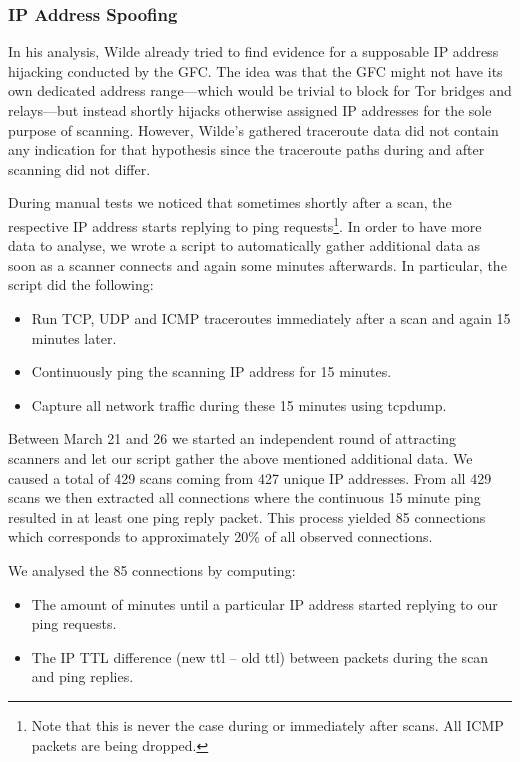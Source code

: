 \documentclass[runningheads,a4paper]{llncs}
\begin{document}
\subsubsection{IP Address Spoofing}
In his analysis, Wilde \cite{twilde} already tried to find evidence for a supposable IP address
hijacking conducted by the GFC. The idea was that the GFC might not have its own dedicated address
range---which would be trivial to block for Tor bridges and relays---but instead shortly hijacks
otherwise assigned IP addresses for the sole purpose of scanning. However, Wilde's gathered
traceroute data did not contain any indication for that hypothesis since the traceroute paths during
and after scanning did not differ.

During manual tests we noticed that sometimes shortly after a scan, the respective IP address starts
replying to ping requests\footnote{Note that this is never the case during or immediately after
scans. All ICMP packets are being dropped.}. In order to have more data to analyse, we wrote a
script to automatically gather additional data as soon as a scanner connects and again some minutes
afterwards. In particular, the script did the following:
\begin{itemize}
	\item Run TCP, UDP and ICMP traceroutes immediately after a scan and again 15 minutes later.
	\item Continuously ping the scanning IP address for 15 minutes.
	\item Capture all network traffic during these 15 minutes using tcpdump.
\end{itemize}

Between March 21 and 26 we started an independent round of attracting scanners and let our script
gather the above mentioned additional data. We caused a total of 429 scans coming from 427 unique IP
addresses. From all 429 scans we then extracted all connections where the continuous 15 minute ping
resulted in at least one ping reply packet. This process yielded 85 connections which corresponds to
approximately 20\% of all observed connections.

We analysed the 85 connections by computing:
\begin{itemize}
	\item The amount of minutes until a particular IP address started replying to our ping requests.
	\item The IP TTL difference (new ttl -- old ttl) between packets during the scan and ping
	replies.
\end{itemize}
\end{document}
